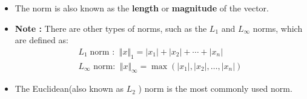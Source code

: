 \begin{frame}
    \begin{itemize}
        \item The norm is also known as the \textbf{length} or \textbf{magnitude} of the vector.
        \item \textbf{Note :} There are other types of norms, such as the $L_1$  and $L_\infty$ norms, which are defined as:
        \begin{align}
        L_1 \;\text{norm :} \;\;\Vert x \Vert_1 = |x_1| + |x_2| + \cdots + |x_n|\\
        L_\infty \text{ norm:} \;\;\Vert x \Vert_\infty = \max(|x_1|, |x_2|, \ldots, |x_n|)
        \end{align}
   
        \item The Euclidean(also known as $L_2$ ) norm is the most commonly used norm. 
    \end{itemize}
\end{frame}
